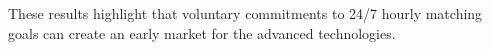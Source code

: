 \lipsum[4]

These results highlight that voluntary commitments to 24/7 hourly matching goals can create an early market for the advanced technologies.